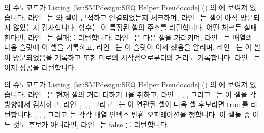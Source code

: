 \begin{fcvref}
 의 수도코드가
Listing~\ref{lst:SMPdesign:SEQ Helper Pseudocode}
() 의  에 보여져 있습니다.
라인~ 는  와  셀이 근접하고 연결되었는지 체크하며,
라인~ 는  셀이 아직 방문되지 않았는지 검사합니다.
 함수는 이 특정된 셀의 주소를 리턴합니다.
어떤 체크든 실패한다면, 라인~ 는 실패를 리턴합니다.
라인~ 은 다음 셀을 가리키며, 라인~ 는
 배열의 다음 슬랏에 이 셀을 기록하고, 라인~
는 이 슬랏이 이제 찼음을 알리며, 라인~ 는 이 셀이
방문되었음을 기록하고 또한 미로의 시작점으로부터의 거리도 기록합니다.
라인~ 는 이제 성공을 리턴합니다.
\end{fcvref}

\begin{fcvref}
 의 슈도코드가
Listing~\ref{lst:SMPdesign:SEQ Helper Pseudocode}
() 의  에 보여져 있습니다.
라인~ 은 현재 셀의 거리 더하기 1을 취하고,
라인~, , ,
그리고~ 는 이 셀을 각 방향에서 검사하고,
라인~, , ,
그리고~ 는 이 연관된 셀이 다음 셀 후보라면 true 를
리턴합니다.
, , , 그리고  는 각각
배열 인덱스 변환 오퍼레이션을 행합니다.
이 셀들 중 어느 것도 후보가 아니라면, 라인~ 는 false 를
리턴합니다.
\end{fcvref}

